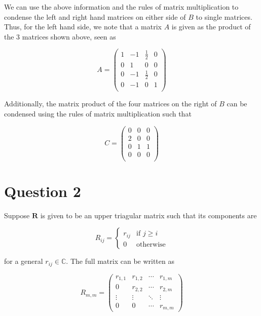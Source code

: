 \documentclass[a4paper,12pt]{article}
\begin{document}
We can use the above information and the rules of matrix multiplication to condense the left and right hand matrices on either side of $B$ to single matrices. Thus, for the left hand side, we note that a matrix $A$ is given as the product of the 3 matrices shown above, seen as 

\begin{equation}
A=\begin{pmatrix}
1 & -1 &\frac{1}{2} & 0 \\
0 & 1 &0 & 0\\
0 & -1 &\frac{1}{2} & 0\\
0 & -1&0 & 1\\
\end{pmatrix}
\end{equation}

Additionally, the matrix product of the four matrices on the right of $B$ can be condensed using the rules of matrix multiplication such that

\begin{equation}
C=\begin{pmatrix}
0 &0 & 0 \\
 2 &0 & 0\\
 0 &1 & 1\\
 0&0 & 0\\
\end{pmatrix}
\end{equation}


\section{Question 2}
Suppose $\textbf{R}$ is given to be an upper triagular matrix such that its components are 

\begin{equation}
R_{ij} =
\left\{
	\begin{array}{ll}
		r_{ij}  & \mbox{if } j \geq i \\
		0 & \mbox{otherwise} 
	\end{array}
\right.
\end{equation}


for a general $r_{ij}\in \mathbb{C}$. The full matrix can be written as

\begin{equation*}
R_{m,m} = 
\begin{pmatrix}
r_{1,1} & r_{1,2} & \cdots & r_{1,m} \\
0 & r_{2,2} & \cdots & r_{2,m} \\
\vdots  & \vdots  & \ddots & \vdots  \\
0 & 0 & \cdots & r_{m,m} 
\end{pmatrix}
\end{equation*}
\end{document}

